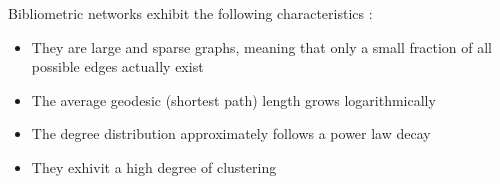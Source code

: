 
Bibliometric networks exhibit the following characteristics \citep{holme2002}:

\begin{itemize}
\item They are large and sparse graphs, meaning that only a small fraction of all possible edges 
actually exist \citep{watts1998,newman2003,jackson2010}
\item The average geodesic (shortest path) length grows logarithmically \citep{leskovec2007}
\item The degree distribution approximately follows a power law decay \citep{barabasi1999}
\item They exhivit a high degree of clustering \citep{newman2003,kretschmer2004}
\end{itemize}